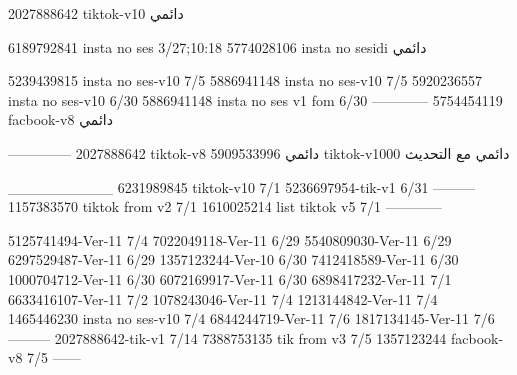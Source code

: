 2027888642 tiktok-v10
دائمي

6189792841 insta no ses
3/27;10:18
5774028106 insta no sesidi
دائمي

5239439815 insta no ses-v10
7/5
5886941148 insta no ses-v10
7/5
5920236557 insta no ses-v10
6/30
5886941148 insta no ses v1 fom
6/30
------------
5754454119 facbook-v8
دائمي


--------------
2027888642 tiktok-v8
دائمي
5909533996 tiktok-v1000
دائمي مع التحديث

__________
6231989845 tiktok-v10
7/1
5236697954-tik-v1
6/31
---------
1157383570 tiktok from v2
7/1
1610025214 list tiktok v5
7/1
------------

5125741494-Ver-11
7/4
7022049118-Ver-11
6/29
5540809030-Ver-11
6/29
6297529487-Ver-11
6/29
1357123244-Ver-10
6/30
7412418589-Ver-11
6/30
1000704712-Ver-11
6/30
6072169917-Ver-11
6/30
6898417232-Ver-11
7/1
6633416107-Ver-11
7/2
1078243046-Ver-11
7/4
1213144842-Ver-11
7/4
1465446230 insta no ses-v10
7/4
6844244719-Ver-11
7/6
1817134145-Ver-11
7/6
---------
2027888642-tik-v1
7/14
7388753135 tik from v3
7/5
1357123244 facbook-v8
7/5
------
